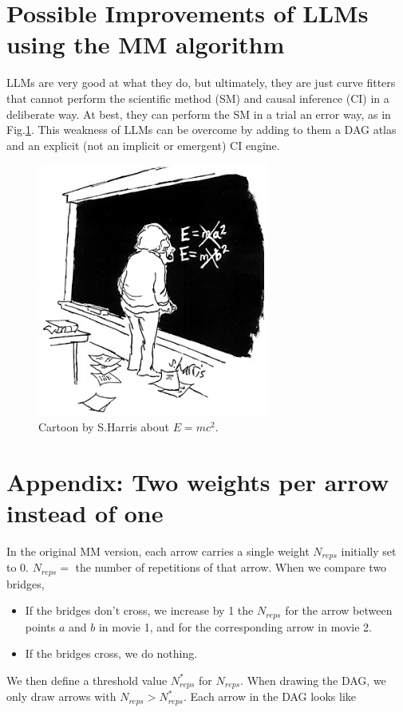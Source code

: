 \documentclass[12pt]{article}
\begin{document}
\section{Possible Improvements
of LLMs 
using the MM algorithm}
 
LLMs
are very good at what they do,
but ultimately, they are just curve fitters
that cannot perform the scientific method (SM)
and causal inference (CI)
in a deliberate way. At best, they can 
perform the SM in a trial an error way, as in 
Fig.\ref{fig-harris-e-mc2}.
This weakness of LLMs can be overcome
by adding to them
a DAG atlas and an explicit (not an implicit or emergent) CI engine.


\begin{figure}[h!]
\centering
\includegraphics[width=3in]
{harris-e-mc2.jpg}
\caption{Cartoon 
by S.Harris
about $E=mc^2$.
}
\label{fig-harris-e-mc2}
\end{figure}

\appendix

\section{Appendix: Two weights per arrow instead of one}\label{app-2-weights}

In the original MM version, each arrow carries a single weight $N_{reps}$ initially set to 0. $N_{reps}=$ the number
of repetitions of that arrow. When we compare two bridges,
\begin{itemize}

\item If the bridges don't
cross, we increase by 1 the $N_{reps}$
 for the arrow between points $a$ and $b$ in
movie 1, and for the
corresponding arrow in movie 2.

\item
If the bridges cross, we do nothing. 
\end{itemize}
We then define a threshold value $N^*_{reps}$
for $N_{reps}$.
When drawing the DAG, we only
draw arrows with $N_{reps}>N^*_{reps}$.
Each arrow in the DAG looks like 
\end{document}
